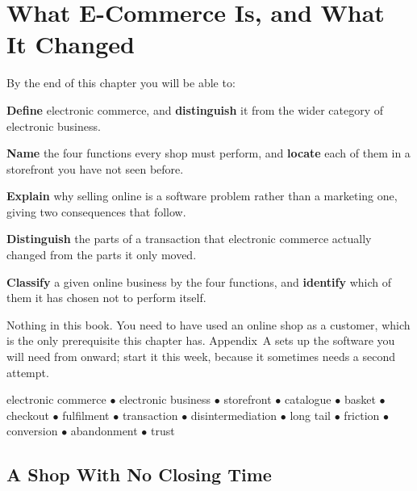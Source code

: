 \chapter{What E-Commerce Is, and What It Changed}\label{ch:what}

\begin{outcomes}
By the end of this chapter you will be able to:
\begin{tight}
  \item \textbf{Define} electronic commerce, and \textbf{distinguish} it from
        the wider category of electronic business.
  \item \textbf{Name} the four functions every shop must perform, and
        \textbf{locate} each of them in a storefront you have not seen before.
  \item \textbf{Explain} why selling online is a software problem rather than a
        marketing one, giving two consequences that follow.
  \item \textbf{Distinguish} the parts of a transaction that electronic commerce
        actually changed from the parts it only moved.
  \item \textbf{Classify} a given online business by the four functions, and
        \textbf{identify} which of them it has chosen not to perform itself.
\end{tight}
\end{outcomes}

\begin{prereq}
Nothing in this book. You need to have used an online shop as a customer, which
is the only prerequisite this chapter has. Appendix~A sets up the software you
will need from  onward; start it this week, because it sometimes
needs a second attempt.
\end{prereq}

\begin{keyterms}
electronic commerce $\bullet$ electronic business $\bullet$ storefront
$\bullet$ catalogue $\bullet$ basket $\bullet$ checkout $\bullet$ fulfilment
$\bullet$ transaction $\bullet$ disintermediation $\bullet$ long tail
$\bullet$ friction $\bullet$ conversion $\bullet$ abandonment
$\bullet$ trust
\end{keyterms}

\section{A Shop With No Closing Time}

